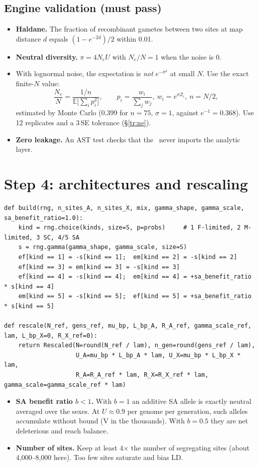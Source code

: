 \subsection{Engine validation (must pass)}
\begin{itemize}
\item \textbf{Haldane.} The fraction of recombinant gametes between two sites at map distance $d$ equals $(1-e^{-2d})/2$ within 0.01.
\item \textbf{Neutral diversity.} $\pi=4N_eU$ with $N_e/N=1$ when the noise is 0.
\item With lognormal noise, the expectation is \emph{not} $e^{-\sigma^2}$ at small $N$. Use the exact finite-$N$ value:
\begin{equation}
\frac{N_e}{N}=\frac{1/n}{\mathbb E\big[\sum_i p_i^2\big]},\qquad p_i=\frac{w_i}{\sum_j w_j},\ w_i=e^{\sigma Z_i},\ n=N/2,
\end{equation}
estimated by Monte Carlo (0.399 for $n=75$, $\sigma=1$, against $e^{-1}=0.368$). Use 12 replicates and a $3\,$SE tolerance (\S\ref{tr:ne}).
\item \textbf{Zero leakage.} An AST test checks that the \IBM\ never imports the analytic layer.
\end{itemize}

\section{Step 4: architectures and rescaling}
\begin{lstlisting}
def build(rng, n_sites_A, n_sites_X, mix, gamma_shape, gamma_scale, sa_benefit_ratio=1.0):
    kind = rng.choice(kinds, size=S, p=probs)     # 1 F-limited, 2 M-limited, 3 SC, 4/5 SA
    s = rng.gamma(gamma_shape, gamma_scale, size=S)
    ef[kind == 1] = -s[kind == 1];  em[kind == 2] = -s[kind == 2]
    ef[kind == 3] = em[kind == 3] = -s[kind == 3]
    ef[kind == 4] = -s[kind == 4];  em[kind == 4] = +sa_benefit_ratio * s[kind == 4]
    em[kind == 5] = -s[kind == 5];  ef[kind == 5] = +sa_benefit_ratio * s[kind == 5]

def rescale(N_ref, gens_ref, mu_bp, L_bp_A, R_A_ref, gamma_scale_ref, lam, L_bp_X=0, R_X_ref=0):
    return Rescaled(N=round(N_ref / lam), n_gen=round(gens_ref / lam),
                    U_A=mu_bp * L_bp_A * lam, U_X=mu_bp * L_bp_X * lam,
                    R_A=R_A_ref * lam, R_X=R_X_ref * lam, gamma_scale=gamma_scale_ref * lam)
\end{lstlisting}
\begin{warnbox}
\begin{itemize}
\item \textbf{SA benefit ratio $b<1$.} With $b=1$ an additive SA allele is exactly neutral averaged over the sexes. At $U\approx0.9$ per genome per generation, such alleles accumulate without bound (V in the thousands). With $b=0.5$ they are net deleterious and reach balance.
\item \textbf{Number of sites.} Keep at least 4$\times$ the number of segregating sites (about 4,000--8,000 here). Too few sites saturate and bias LD.
\end{itemize}
\end{warnbox}

